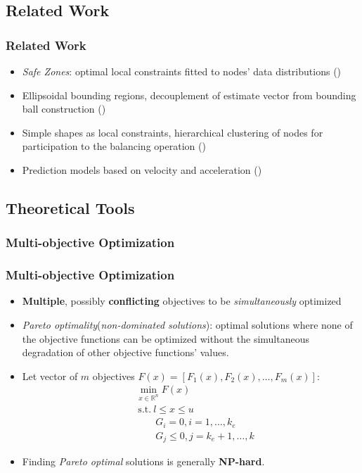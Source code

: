 \documentclass[hyperref={pdfpagelabels=false}]{beamer}
\begin{document}
\subsection{Related Work}
\begin{frame} \frametitle{Related Work}
\begin{itemize}
\item \emph{Safe Zones}: optimal local constraints fitted to nodes' data distributions {\tiny()}
\item Ellipsoidal bounding regions, decouplement of estimate vector from bounding ball construction {\tiny()}
\item Simple shapes as local constraints, hierarchical clustering of nodes for participation to the balancing operation {\tiny()}
\item Prediction models based on velocity and acceleration {\tiny()}
\end{itemize}
\end{frame}

\subsection{Theoretical Tools}
\subsubsection*{Multi-objective Optimization}
\begin{frame} \frametitle{Multi-objective Optimization}
\begin{itemize}
\item \textbf{Multiple}, possibly \textbf{conflicting} objectives to be \emph{simultaneously} optimized
\item \emph{Pareto optimality}(\emph{non-dominated solutions}): optimal solutions where none of the objective functions can be optimized without the simultaneous degradation of other objective functions' values.
\item Let vector of $m$ objectives $F(x)=[F_1(x), F_2(x), \dots, F_m(x)]$:
\begin{align*}
&\min_{x \in \mathbb{R}^n}{F(x)}\\
&\ \text{s.t.}\ l\leq x \leq u \\
			&\qquad G_i=0, i=1,\dots,k_e\\
			&\qquad G_j\leq 0, j=k_e+1, \dots,k
\end{align*}
\item Finding \emph{Pareto optimal} solutions is generally \textbf{NP-hard}.
\end{itemize}
\end{frame}
\end{document}
